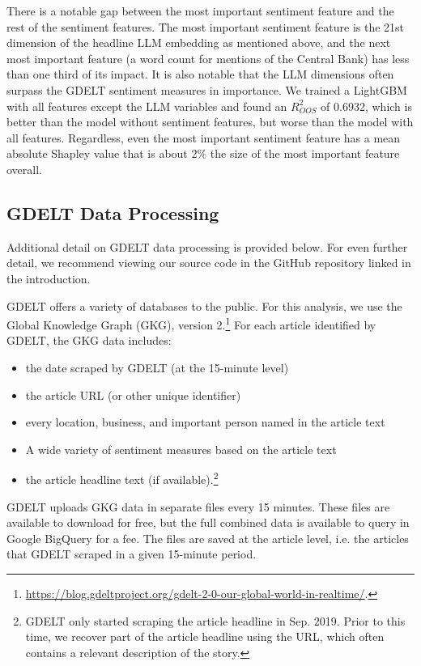 \documentclass[12pt]{article}
\begin{document}
There is a notable gap between the most important sentiment feature and the rest of the sentiment features. The most important sentiment feature is the 21st dimension of the headline LLM embedding as mentioned above, and the next most important feature (a word count for mentions of the Central Bank) has less than one third of its impact. It is also notable that the LLM dimensions often surpass the GDELT sentiment measures in importance. We trained a LightGBM with all features except the LLM variables and found an $R^2_{OOS}$ of 0.6932, which is better than the model without sentiment features, but worse than the model with all features. Regardless, even the most important sentiment feature has a mean absolute Shapley value that is about 2\% the size of the most important feature overall.

\subsection{GDELT Data Processing}
\label{section:gdelt_details}
Additional detail on GDELT data processing is provided below. For even further detail, we recommend viewing our source code in the GitHub repository linked in the introduction.

GDELT offers a variety of databases to the public. For this analysis, we use the Global Knowledge Graph (GKG), version 2.\footnote{\url{https://blog.gdeltproject.org/gdelt-2-0-our-global-world-in-realtime/}.} For each article identified by GDELT, the GKG data includes:
\begin{itemize}
\singlespacing
    \item the date scraped by GDELT (at the 15-minute level)
    \item the article URL (or other unique identifier)
    \item every location, business, and important person named in the article text
    \item A wide variety of sentiment measures based on the article text
    \item the article headline text (if available).\footnote{GDELT only started scraping the article headline in Sep. 2019. Prior to this time, we recover part of the article headline using the URL, which often contains a relevant description of the story.}
\end{itemize}
GDELT uploads GKG data in separate files every 15 minutes. These files are available to download for free, but the full combined data is available to query in Google BigQuery for a fee. The files are saved at the article level, i.e. the articles that GDELT scraped in a given 15-minute period.
\end{document}
